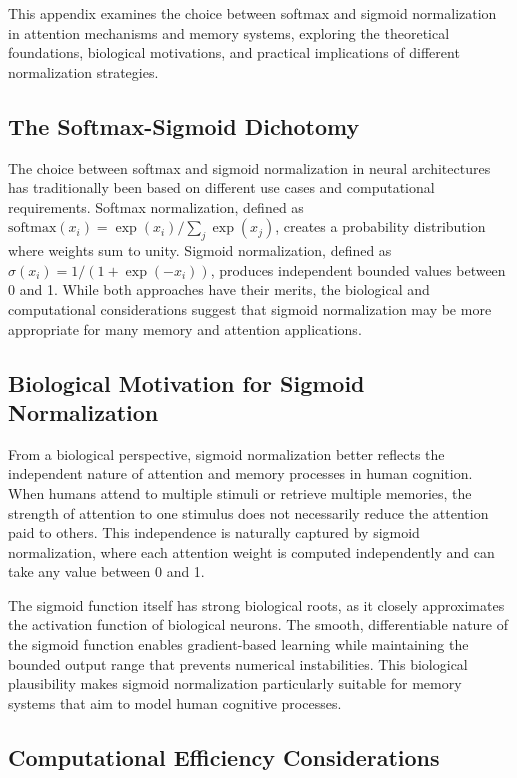 \documentclass{article}
\begin{document}
This appendix examines the choice between softmax and sigmoid normalization in attention mechanisms and memory systems, exploring the theoretical foundations, biological motivations, and practical implications of different normalization strategies.

\subsection{The Softmax-Sigmoid Dichotomy}

The choice between softmax and sigmoid normalization in neural architectures has traditionally been based on different use cases and computational requirements. Softmax normalization, defined as $\text{softmax}(x_i) = \exp(x_i) / \sum_j \exp(x_j)$, creates a probability distribution where weights sum to unity. Sigmoid normalization, defined as $\sigma(x_i) = 1 / (1 + \exp(-x_i))$, produces independent bounded values between 0 and 1. While both approaches have their merits, the biological and computational considerations suggest that sigmoid normalization may be more appropriate for many memory and attention applications.

\subsection{Biological Motivation for Sigmoid Normalization}

From a biological perspective, sigmoid normalization better reflects the independent nature of attention and memory processes in human cognition. When humans attend to multiple stimuli or retrieve multiple memories, the strength of attention to one stimulus does not necessarily reduce the attention paid to others. This independence is naturally captured by sigmoid normalization, where each attention weight is computed independently and can take any value between 0 and 1.

The sigmoid function itself has strong biological roots, as it closely approximates the activation function of biological neurons. The smooth, differentiable nature of the sigmoid function enables gradient-based learning while maintaining the bounded output range that prevents numerical instabilities. This biological plausibility makes sigmoid normalization particularly suitable for memory systems that aim to model human cognitive processes.

\subsection{Computational Efficiency Considerations}
\end{document}
